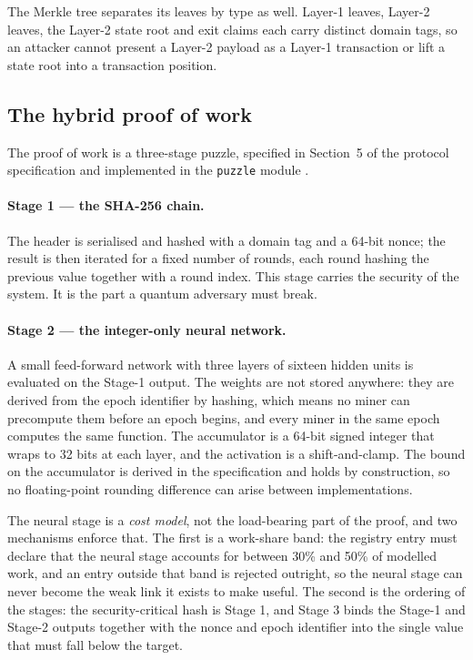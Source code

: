 \documentclass{article}
\begin{document}
The Merkle tree separates its leaves by type as well. Layer-1 leaves, Layer-2
leaves, the Layer-2 state root and exit claims each carry distinct domain
tags, so an attacker cannot present a Layer-2 payload as a Layer-1 transaction
or lift a state root into a transaction position.

\subsection{The hybrid proof of work}
\label{sec:pow}

The proof of work is a three-stage puzzle, specified in
Section~5 of the protocol specification and implemented in the \texttt{puzzle}
module \cite{srct-spec}.

\paragraph{Stage 1 --- the SHA-256 chain.} The header is serialised and hashed
with a domain tag and a 64-bit nonce; the result is then iterated for a fixed
number of rounds, each round hashing the previous value together with a
round index. This stage carries the security of the system. It is the part a
quantum adversary must break.

\paragraph{Stage 2 --- the integer-only neural network.} A small feed-forward
network with three layers of sixteen hidden units is evaluated on the Stage-1
output. The weights are not stored anywhere: they are derived from the epoch
identifier by hashing, which means no miner can precompute them before an epoch
begins, and every miner in the same epoch computes the same function. The
accumulator is a 64-bit signed integer that wraps to 32 bits at each layer, and
the activation is a shift-and-clamp. The bound on the accumulator is derived in
the specification and holds by construction, so no floating-point rounding
difference can arise between implementations.

The neural stage is a \emph{cost model}, not the load-bearing part of the
proof, and two mechanisms enforce that. The first is a work-share band: the
registry entry must declare that the neural stage accounts for between 30\% and
50\% of modelled work, and an entry outside that band is rejected outright, so
the neural stage can never become the weak link it exists to make useful. The
second is the ordering of the stages: the security-critical hash is Stage 1,
and Stage 3 binds the Stage-1 and Stage-2 outputs together with the nonce and
epoch identifier into the single value that must fall below the target.
\end{document}

